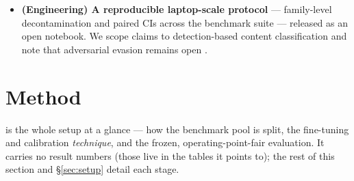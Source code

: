 \documentclass[sigconf,nonacm]{acmart}
\begin{document}
\begin{itemize}
\item \textbf{(Engineering) A reproducible laptop-scale protocol} --- family-level decontamination and paired CIs across the benchmark suite \cite{mazeika2024harmbench,han2024wildguard,jiang2024wildteaming,xie2024sorrybench,rottger2024xstest,cui2024orbench,chao2024jailbreakbench,lin2023toxicchat,ji2023beavertails,markov2023holistic} --- released as an open notebook. We scope claims to detection-based content classification and note that adversarial evasion remains open \cite{hackett2025bypassing}.
\end{itemize}

\section{Method}

 is the whole setup at a glance --- how the benchmark pool is split, the fine-tuning and calibration \emph{technique}, and the frozen, operating-point-fair evaluation. It carries no result numbers (those live in the tables it points to); the rest of this section and \S\ref{sec:setup} detail each stage.
\end{document}
